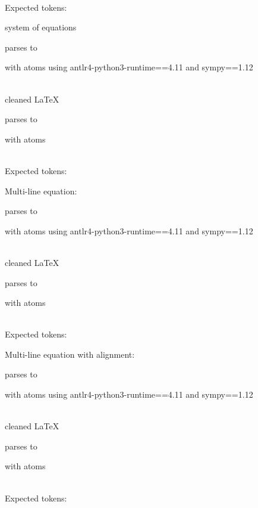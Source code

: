 \documentclass{article}
\begin{document}
\ \\
Expected tokens:



\hrulefill

system of equations

parses to

with atoms
using antlr4-python3-runtime==4.11 and sympy==1.12

\ \\
cleaned \LaTeX

parses to

with atoms


\ \\
Expected tokens:



\hrulefill

Multi-line equation:

parses to

with atoms
using antlr4-python3-runtime==4.11 and sympy==1.12

\ \\
cleaned \LaTeX

parses to

with atoms


\ \\
Expected tokens:



\hrulefill

Multi-line equation with alignment:

parses to

with atoms
using antlr4-python3-runtime==4.11 and sympy==1.12

\ \\
cleaned \LaTeX

parses to

with atoms


\ \\
Expected tokens:

\end{document}
